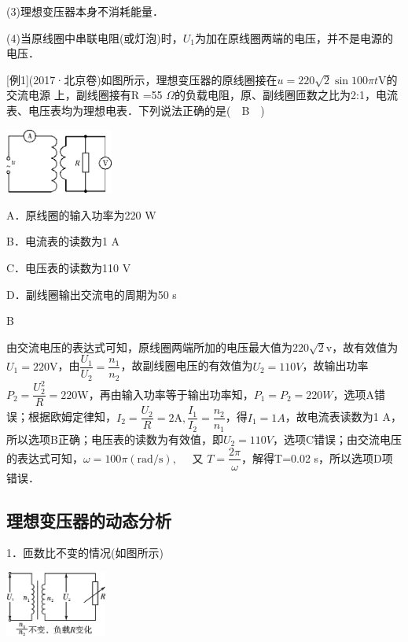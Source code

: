 (3)理想变压器本身不消耗能量．

(4)当原线圈中串联电阻(或灯泡)时，$U_1$为加在原线圈两端的电压，并不是电源的电压．

{[}例1{]}(2017·北京卷)如图所示，理想变压器的原线圈接在$u=220 \sqrt{2} \sin 100 \pi t \mathrm{V}$的交流电源
上，副线圈接有R =55
$\Omega$的负载电阻，原、副线圈匝数之比为2:1，电流表、电压表均为理想电表．下列说法正确的是(　B　)
\begin{center}\includegraphics[width=1.39653in,height=0.83958in]{media/image451.png}\end{center}

A．原线圈的输入功率为220 W

B．电流表的读数为1 A

C．电压表的读数为110 V

D．副线圈输出交流电的周期为50 s
\begin{solution}
	B
	
	由交流电压的表达式可知，原线圈两端所加的电压最大值为$220 \sqrt{2} \mathrm{v}$，故有效值为$U_{1}=220 \mathrm{V}$，由$\dfrac{U_{1}}{U_{2}}=\dfrac{n_{1}}{n_{2}}$，故副线圈电压的有效值为$U_2=110V$，故输出功率$P_{2}=\dfrac{U_{2}^{2}}{R}=220 \mathrm{W}$，再由输入功率等于输出功率知，$P_1=P_2=220W$，选项A错误；根据欧姆定律知，$I_{2}=\dfrac{U_{2}}{R}=2 \mathrm{A}, \dfrac{I_{1}}{I_{2}}=\dfrac{n_{2}}{n_{1}}$，得$I_1=1 A$，故电流表读数为1
A，所以选项B正确；电压表的读数为有效值，即$U_2=110
V$，选项C错误；由交流电压的表达式可知，$\omega=100 \pi(\mathrm{rad} / \mathrm{s}), \quad$ 又 $T=\dfrac{2 \pi}{\omega}$，解得T=0.02
s，所以选项D项错误．
\end{solution}
\newpage
\subsection{理想变压器的动态分析}

1．匝数比不变的情况(如图所示)

\begin{center}\includegraphics[width=1.31111in,height=0.84931in]{media/image452.png}\end{center}

